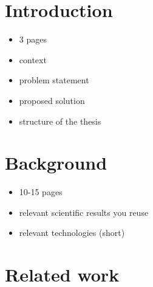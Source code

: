 \documentclass[11pt,a4paper]{article}
\begin{document}



\section{Introduction}
\label{sec:introduction}

\begin{itemize} 
    \item 3 pages
    \item context
    \item problem statement
    \item proposed solution
    \item structure of the thesis 
\end{itemize}

\section{Background}
\label{sec:background}

\begin{itemize} 
    \item 10-15 pages
    \item relevant scientific results you reuse 
    \item relevant technologies (short)
\end{itemize}

\section{Related work}
\label{sec:relatedwork}
\end{document}
